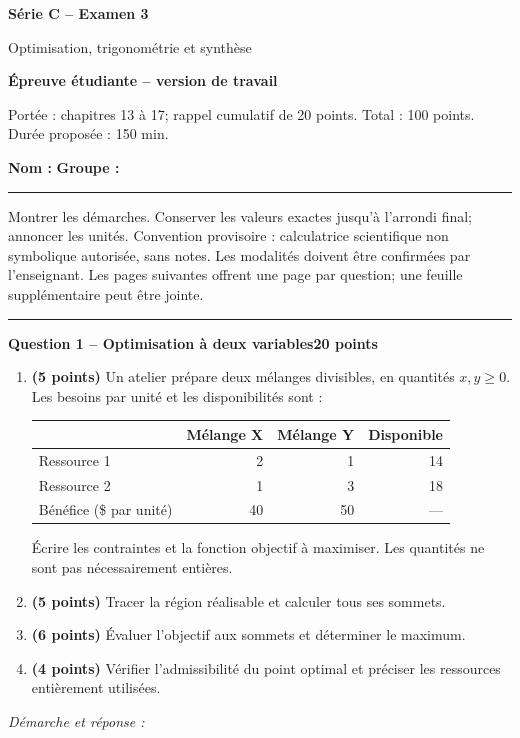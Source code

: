 \documentclass[11pt,a4paper]{article}
\begin{document}
{\LARGE\bfseries Série C -- Examen 3}\par
{\large Optimisation, trigonométrie et synthèse}\par
\textbf{Épreuve étudiante -- version de travail}\par
Portée : chapitres 13 à 17; rappel cumulatif de 20 points. Total : 100 points. Durée proposée : 150 min.\par
\textbf{Nom :} \hrulefill\quad \textbf{Groupe :} \rule{22mm}{0.3pt}\par
\small Montrer les démarches. Conserver les valeurs exactes jusqu’à l’arrondi final; annoncer les unités. Convention provisoire : calculatrice scientifique non symbolique autorisée, sans notes. Les modalités doivent être confirmées par l’enseignant. Les pages suivantes offrent une page par question; une feuille supplémentaire peut être jointe.\normalsize\par
\vspace{3mm}\hrule\vspace{4mm}
{\large\bfseries Question 1 -- Optimisation à deux variables}\hfill\textbf{20 points}\par
\begin{enumerate}
\item \textbf{(5 points)} Un atelier prépare deux mélanges divisibles, en quantités \(x,y\ge0\). Les besoins par unité et les disponibilités sont :
\begin{center}\begin{tabular}{lrrr}\toprule
& Mélange X & Mélange Y & Disponible\\\midrule
Ressource 1 & 2 & 1 & 14\\
Ressource 2 & 1 & 3 & 18\\
Bénéfice (\$ par unité) & 40 & 50 & ---\\\bottomrule
\end{tabular}\end{center}
Écrire les contraintes et la fonction objectif à maximiser. Les quantités ne sont pas nécessairement entières.
\item \textbf{(5 points)} Tracer la région réalisable et calculer tous ses sommets.
\item \textbf{(6 points)} Évaluer l’objectif aux sommets et déterminer le maximum.
\item \textbf{(4 points)} Vérifier l’admissibilité du point optimal et préciser les ressources entièrement utilisées.
\end{enumerate}
\vspace{3mm}\textit{Démarche et réponse :}\par\vfill
\end{document}
